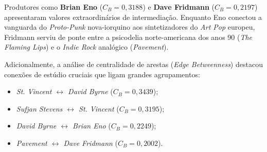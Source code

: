 \documentclass[conference]{IEEEtran}
\begin{document}
\begin{table}[htbp]
\caption{Centralidade de Intermediação dos Produtores Musicais no LCC}
\begin{center}
\end{center}
\label{tab:produtores}
\end{table}

Produtores como \textbf{Brian Eno} ($C_B = 0,3188$) e \textbf{Dave Fridmann} ($C_B = 0,2197$) apresentaram valores extraordinários de intermediação. Enquanto Eno conectou a vanguarda do \textit{Proto-Punk} nova-iorquino aos sintetizadores do \textit{Art Pop} europeu, Fridmann serviu de ponte entre a psicodelia norte-americana dos anos 90 (\textit{The Flaming Lips}) e o \textit{Indie Rock} analógico (\textit{Pavement}).

Adicionalmente, a análise de centralidade de arestas (\textit{Edge Betweenness}) destacou conexões de estúdio cruciais que ligam grandes agrupamentos:
\begin{itemize}
    \item \textit{St. Vincent $\leftrightarrow$ David Byrne} ($C_B = 0,3439$);
    \item \textit{Sufjan Stevens $\leftrightarrow$ St. Vincent} ($C_B = 0,3195$);
    \item \textit{David Byrne $\leftrightarrow$ Brian Eno} ($C_B = 0,2249$);
    \item \textit{Pavement $\leftrightarrow$ Dave Fridmann} ($C_B = 0,2002$).
\end{itemize}
\end{document}
